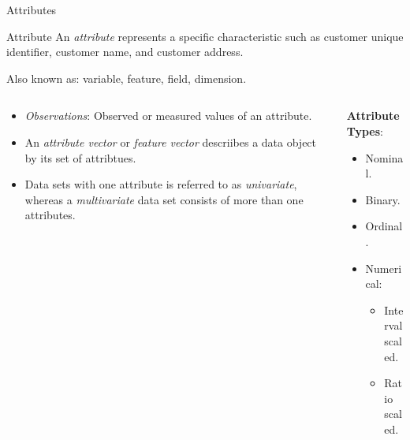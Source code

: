 \begin{frame}{Attributes}
  \begin{block}{Attribute}
    An \textit{attribute} represents a specific characteristic such as customer
    unique identifier, customer name, and customer address.
  \end{block}

  Also known as: variable, feature, field, dimension.\\\medskip


  \begin{columns}[t]
    \begin{column}{0.7\columnwidth}
      \begin{itemize}
      \item \textit{Observations}: Observed or measured values of an attribute.
      \item An \textit{attribute vector} or \textit{feature vector} descriibes a
        data object by its set of attribtues.
      \item Data sets with one attribute is referred to as \textit{univariate},
        whereas a \textit{multivariate} data set consists of more than one
        attributes.
      \end{itemize}
    \end{column}

    \begin{column}{0.3\columnwidth}
      \textbf{Attribute Types}:
      \begin{itemize}
      \item Nominal.
      \item Binary.
      \item Ordinal.
      \item Numerical:
        \begin{itemize}
        \item Interval scaled.
        \item Ratio scaled.
        \end{itemize}
      \end{itemize}
        \end{column}
  \end{columns}
\end{frame}

